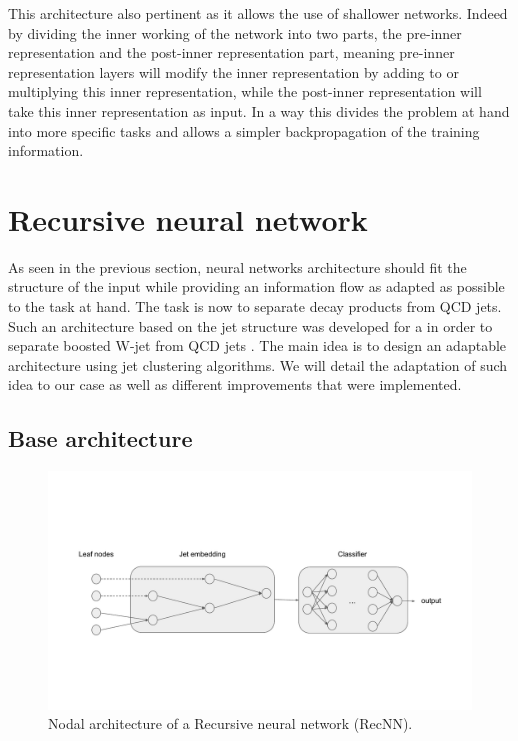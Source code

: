 This architecture also pertinent as it allows the use of shallower networks. Indeed by dividing the inner working of the network into two parts, the pre-inner representation and the post-inner representation part, meaning pre-inner representation layers will modify the inner representation by adding to or multiplying this inner representation, while the post-inner representation will take this inner representation as input. In a way this divides the problem at hand into more specific tasks and allows a simpler backpropagation of the training information.

\section{Recursive neural network}
\label{sec:RecNN}
As seen in the previous section, neural networks architecture should fit the structure of the input while providing an information flow as adapted as possible to the task at hand. The task is now to separate \tauh decay products from QCD jets. Such an architecture based on the jet structure was developed for a in order to separate boosted W-jet from QCD jets \cite{Louppe:2017ipp}. The main idea is to design an adaptable architecture using jet clustering algorithms. We will detail the adaptation of such idea to our case as well as different improvements that were implemented.

\subsection{Base architecture}

\begin{figure}
    \centering
    \includegraphics[width=\textwidth]{Images/RecNNdiagram.pdf}
    \caption{Nodal architecture of a Recursive neural network (RecNN).}
    \label{fig:recnn_architecture}
\end{figure}

